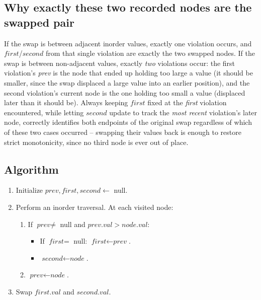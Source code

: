 \subsection*{Why exactly these two recorded nodes are the swapped pair}

If the swap is between adjacent inorder values, exactly one violation
occurs, and $\textit{first}$/$\textit{second}$ from that single violation
are exactly the two swapped nodes. If the swap is between non-adjacent
values, exactly \emph{two} violations occur: the first violation's
\textit{prev} is the node that ended up holding too large a value (it
should be smaller, since the swap displaced a large value into an
earlier position), and the second violation's current node is the one
holding too small a value (displaced later than it should be). Always
keeping $\textit{first}$ fixed at the \emph{first} violation encountered,
while letting $\textit{second}$ update to track the \emph{most recent}
violation's later node, correctly identifies both endpoints of the
original swap regardless of which of these two cases occurred --
swapping their values back is enough to restore strict monotonicity,
since no third node is ever out of place.

\subsection*{Algorithm}

\begin{enumerate}
  \item Initialize $\textit{prev}, \textit{first}, \textit{second}
        \gets$ null.
  \item Perform an inorder traversal. At each visited node:
  \begin{enumerate}
    \item If $\textit{prev} \ne$ null and $\textit{prev}.\textit{val} >
          \textit{node}.\textit{val}$:
    \begin{itemize}
      \item If $\textit{first} = $ null: $\textit{first} \gets
            \textit{prev}$.
      \item $\textit{second} \gets \textit{node}$.
    \end{itemize}
    \item $\textit{prev} \gets \textit{node}$.
  \end{enumerate}
  \item Swap $\textit{first}.\textit{val}$ and
        $\textit{second}.\textit{val}$.
\end{enumerate}

